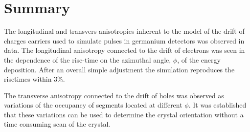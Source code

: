 \section{Summary}
\label{sec:psa:sum}

The longitudinal and transvers anisotropies inherent to the model of the drift of charges carriers used to simulate pulses in germanium detectors was observed in data. The longitudinal anisotropy connected to the drift of electrons was seen in the dependence of the rise-time on the azimuthal angle, $\phi$, of the energy deposition. After an overall simple adjustment the simulation reproduces the risetimes within 3\%.

The transverse anisotropy connected to the drift of holes was observed as variations of the occupancy of segments located at different $\phi$. It was established that these variations can be used to determine the crystal orientation without a time consuming scan of the crystal.

